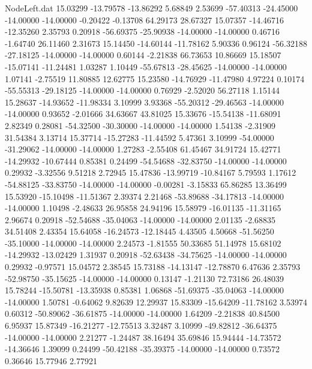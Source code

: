 \begin{filecontents}{NodeLeft.dat}
  15.03299  -13.79578  -13.86292     5.68849    2.53699  -57.40313  -24.45000  -14.00000  -14.00000   -0.20422   -0.13708   64.29173   28.67327
  15.07357  -14.46716  -12.35260     2.35793    0.20918  -56.69375  -25.90938  -14.00000  -14.00000    0.46716   -1.64740   26.11460    2.31673
  15.14450  -14.60144  -11.78162     5.90336    0.96124  -56.32188  -27.18125  -14.00000  -14.00000    0.60144   -2.21838   66.73653   10.86669
  15.18507  -15.07141  -11.24481     1.03287    1.10449  -55.67813  -28.45625  -14.00000  -14.00000    1.07141   -2.75519   11.80885   12.62775
  15.23580  -14.76929  -11.47980     4.97224    0.10174  -55.55313  -29.18125  -14.00000  -14.00000    0.76929   -2.52020   56.27118    1.15144
  15.28637  -14.93652  -11.98334     3.10999    3.93368  -55.20312  -29.46563  -14.00000  -14.00000    0.93652   -2.01666   34.63667   43.81025
  15.33676  -15.54138  -11.68091     2.82349    0.28081  -54.32500  -30.30000  -14.00000  -14.00000    1.54138   -2.31909   31.54384    3.13714
  15.37714  -15.27283  -11.44592     5.47361    3.10999  -54.00000  -31.29062  -14.00000  -14.00000    1.27283   -2.55408   61.45467   34.91724
  15.42771  -14.29932  -10.67444     0.85381    0.24499  -54.54688  -32.83750  -14.00000  -14.00000    0.29932   -3.32556    9.51218    2.72945
  15.47836  -13.99719  -10.84167     5.79593    1.17612  -54.88125  -33.83750  -14.00000  -14.00000   -0.00281   -3.15833   65.86285   13.36499
  15.53920  -15.10498  -11.51367     2.39374    2.21468  -53.89688  -34.17813  -14.00000  -14.00000    1.10498   -2.48633   26.95858   24.94196
  15.58979  -16.01135  -11.31165     2.96674    0.20918  -52.54688  -35.04063  -14.00000  -14.00000    2.01135   -2.68835   34.51408    2.43354
  15.64058  -16.24573  -12.18445     4.43505    4.50668  -51.56250  -35.10000  -14.00000  -14.00000    2.24573   -1.81555   50.33685   51.14978
  15.68102  -14.29932  -13.02429     1.31937    0.20918  -52.63438  -34.75625  -14.00000  -14.00000    0.29932   -0.97571   15.04572    2.38545
  15.73188  -14.13147  -12.78870     6.47636    2.35793  -52.98750  -35.15625  -14.00000  -14.00000    0.13147   -1.21130   72.73186   26.48039
  15.78244  -15.50781  -13.35938     0.85381    1.06868  -51.69375  -35.04063  -14.00000  -14.00000    1.50781   -0.64062    9.82639   12.29937
  15.83309  -15.64209  -11.78162     3.53974    0.60312  -50.89062  -36.61875  -14.00000  -14.00000    1.64209   -2.21838   40.84500    6.95937
  15.87349  -16.21277  -12.75513     3.32487    3.10999  -49.82812  -36.64375  -14.00000  -14.00000    2.21277   -1.24487   38.16494   35.69846
  15.94444  -14.73572  -14.36646     1.39099    0.24499  -50.42188  -35.39375  -14.00000  -14.00000    0.73572    0.36646   15.77946    2.77921

\end{filecontents}
